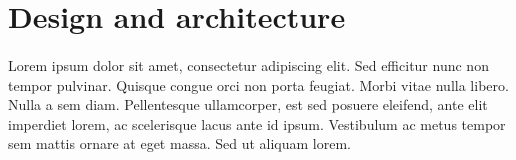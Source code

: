 \section{Design and architecture}
\paragraph{}  Lorem ipsum dolor sit amet, consectetur adipiscing elit. Sed efficitur nunc non tempor pulvinar. Quisque congue orci non porta feugiat. Morbi vitae nulla libero. Nulla a sem diam. Pellentesque ullamcorper, est sed posuere eleifend, ante elit imperdiet lorem, ac scelerisque lacus ante id ipsum. Vestibulum ac metus tempor sem mattis ornare at eget massa. Sed ut aliquam lorem. 